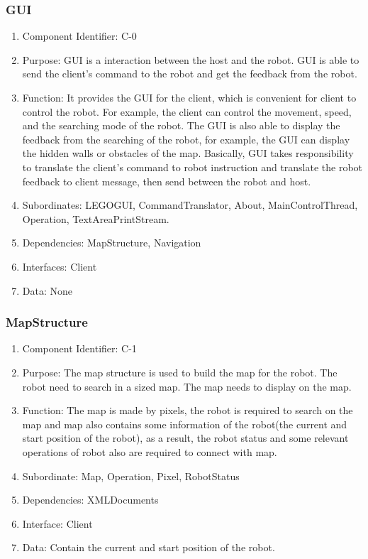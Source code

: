 \documentclass[11pt, a4paper]{report}
\begin{document}
\subsubsection{GUI}
\begin{enumerate}
\item Component Identifier: C-0
\item Purpose: GUI is a interaction between the host and the robot. GUI is able to send the client's command to the robot and get the feedback from the robot.  
\item Function: It provides the GUI for the client, which is convenient for client to control the robot. For example, the client can control the movement, speed, and the searching mode of the robot. The GUI is also able to display the feedback from the searching of the robot, for example, the GUI can display the hidden walls or obstacles of the map. Basically, GUI takes responsibility to translate the client's command to robot instruction and translate the robot feedback to client message, then send between the robot and host.   
\item Subordinates: LEGOGUI, CommandTranslator, About, MainControlThread, Operation, TextAreaPrintStream. 
\item Dependencies: MapStructure, Navigation
\item Interfaces: Client
\item Data: None
\end{enumerate}

\subsubsection{MapStructure}
\begin{enumerate}
\item Component Identifier: C-1
\item Purpose: The map structure is used to build the map for the robot. The robot need to search in a sized map. The map needs to display on the map. 
\item Function: The map is made by pixels, the robot is required to search on the map and map also contains some information of the robot(the current and start position of the robot), as a result, the robot status and some relevant operations of robot also are required to connect with map.
\item Subordinate: Map, Operation, Pixel, RobotStatus
\item Dependencies: XMLDocuments
\item Interface: Client
\item Data: Contain the current and start position of the robot. 
\end{enumerate}
\end{document}
